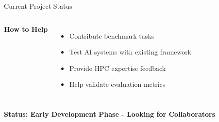 \documentclass[compress,aspectratio=169]{beamer}
\begin{document}
\begin{frame}{Current Project Status}
\begin{columns}[t]
            \vspace{0.5em}
            \textbf{How to Help}
            \scriptsize
            \begin{itemize}
                \item Contribute benchmark tasks
                \item Test AI systems with existing framework
                \item Provide HPC expertise feedback
                \item Help validate evaluation metrics
            \end{itemize}
    \end{columns}
    
    \vspace{0.5em}
    \begin{center}
        \textcolor{orange!80!black}{\small \textbf{Status: Early Development Phase - Looking for Collaborators}}
    \end{center}
\end{frame}
\end{document}
